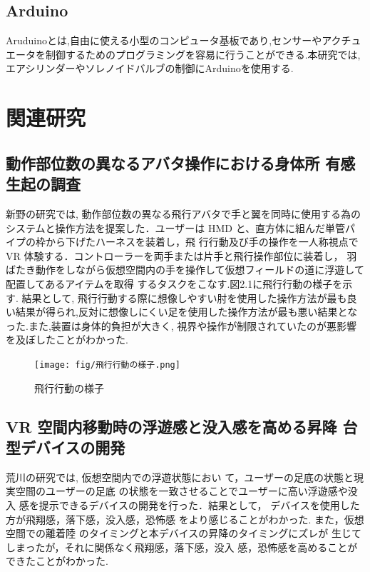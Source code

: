 \subsection{Arduino}

Aruduinoとは,自由に使える小型のコンピュータ基板であり,センサーやアクチュエータを制御するためのプログラミングを容易に行うことができる.本研究では,エアシリンダーやソレノイドバルブの制御にArduinoを使用する.

\section{関連研究}

\subsection{動作部位数の異なるアバタ操作における身体所
有感生起の調査}

新野の研究では, 動作部位数の異なる飛行アバタで手と翼を同時に使用する為のシステムと操作方法を提案した．ユーザーは HMD と、直方体に組んだ単管パイプの枠から下げたハーネスを装着し，飛
行行動及び手の操作を一人称視点で VR 体験する．コントローラーを両手または片手と飛行操作部位に装着し，
羽ばたき動作をしながら仮想空間内の手を操作して仮想フィールドの道に浮遊して配置してあるアイテムを取得
するタスクをこなす.図2.1に飛行行動の様子を示す.
結果として, 飛行行動する際に想像しやすい肘を使用した操作方法が最も良い結果が得られ,反対に想像しにくい足を使用した操作方法が最も悪い結果となった.また,装置は身体的負担が大きく, 視界や操作が制限されていたのが悪影響を及ぼしたことがわかった.

\begin{figure}[htbp]
  \centering
  \texttt{[image: fig/飛行行動の様子.png]}
  \caption{飛行行動の様子}
  \label{fig:chart1}
\end{figure}


\subsection{VR 空間内移動時の浮遊感と没入感を高める昇降
台型デバイスの開発}

荒川の研究では, 仮想空間内での浮遊状態におい
て，ユーザーの足底の状態と現実空間のユーザーの足底
の状態を一致させることでユーザーに高い浮遊感や没入
感を提示できるデバイスの開発を行った．結果として，
デバイスを使用した方が飛翔感，落下感，没入感，恐怖感
をより感じることがわかった. また，仮想空間での離着陸
のタイミングと本デバイスの昇降のタイミングにズレが
生じてしまったが，それに関係なく飛翔感，落下感，没入
感，恐怖感を高めることができたことがわかった.

